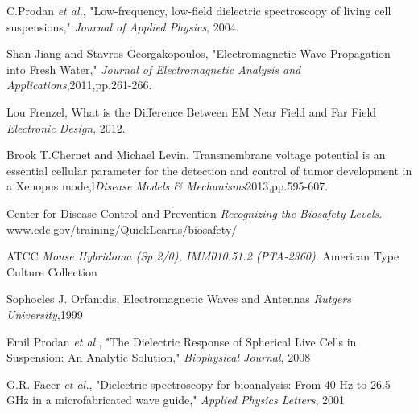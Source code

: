 \documentclass[journal]{IEEEtran}
\begin{document}
\begin{thebibliography}{9}

C.Prodan \textit{et al.},
"Low-frequency, low-field dielectric spectroscopy of living cell suspensions,"
\textit{Journal of Applied Physics}, 2004.

Shan Jiang and Stavros Georgakopoulos,
"Electromagnetic Wave Propagation into Fresh Water,"
\textit{Journal of Electromagnetic Analysis and Applications},2011,pp.261-266.

Lou Frenzel,
What is the Difference Between EM Near Field and Far Field
\textit{Electronic Design}, 2012.

Brook T.Chernet and Michael Levin,
Transmembrane voltage potential is an essential cellular parameter for the detection and control of tumor development in a Xenopus mode,l\textit{Disease Models \& Mechanisms}2013,pp.595-607.

Center for Disease Control and Prevention
\textit{Recognizing the Biosafety Levels}.
\url{www.cdc.gov/training/QuickLearns/biosafety/}

ATCC
\textit{Mouse Hybridoma (Sp 2/0), IMM010.51.2 (PTA-2360)}.
American Type Culture Collection

Sophocles J. Orfanidis,
Electromagnetic Waves and Antennas
\textit{Rutgers University},1999

Emil Prodan \textit{et al.},
"The Dielectric Response of Spherical Live Cells in Suspension: An Analytic Solution," \textit{Biophysical Journal}, 2008

G.R. Facer \textit{et al.},
"Dielectric spectroscopy for bioanalysis: From 40 Hz to 26.5 GHz in a microfabricated wave guide," \textit{Applied Physics Letters}, 2001

\end{thebibliography}
\end{document}
